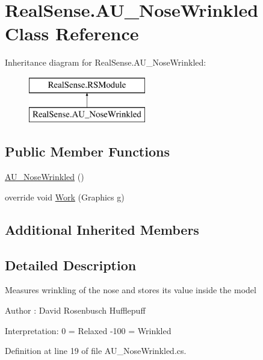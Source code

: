 \hypertarget{class_real_sense_1_1_a_u___nose_wrinkled}{}\section{Real\+Sense.\+A\+U\+\_\+\+Nose\+Wrinkled Class Reference}
\label{class_real_sense_1_1_a_u___nose_wrinkled}
Inheritance diagram for Real\+Sense.\+A\+U\+\_\+\+Nose\+Wrinkled\+:\begin{figure}[H]
\begin{center}
\leavevmode
\includegraphics[height=2.000000cm]{class_real_sense_1_1_a_u___nose_wrinkled}
\end{center}
\end{figure}
\subsection*{Public Member Functions}
\begin{DoxyCompactItemize}
\item 
\hyperlink{class_real_sense_1_1_a_u___nose_wrinkled_a1dfdf22628e88a848b5359e623294044}{A\+U\+\_\+\+Nose\+Wrinkled} ()
\item 
override void \hyperlink{class_real_sense_1_1_a_u___nose_wrinkled_afa5099e1c15f8f0f3d9633a42ed69817}{Work} (Graphics g)
\end{DoxyCompactItemize}
\subsection*{Additional Inherited Members}


\subsection{Detailed Description}
Measures wrinkling of the nose and stores its\textquotesingle{} value inside the model \begin{DoxyAuthor}{Author}
\+: David Rosenbusch  Hufflepuff
\end{DoxyAuthor}
Interpretation\+: 0 = Relaxed -\/100 = Wrinkled 

Definition at line 19 of file A\+U\+\_\+\+Nose\+Wrinkled.\+cs.



